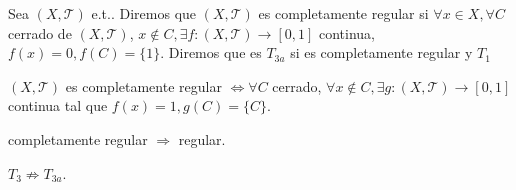  \begin{defn}
   Sea $( X, \mathcal{T} )$ e.t.. Diremos que $( X, \mathcal{T} )$ es completamente regular si $\forall x \in X, \forall C$ cerrado de $( X, \mathcal{T} )$, $x \not \in C, \exists f: ( X, \mathcal{T} ) \to [0,1]$ continua, $f(x) = 0, f(C) = \{ 1 \}$. Diremos que es $T_{3a}$ si es completamente regular y $T_{1}$
 \end{defn}

  \begin{obs}
    $( X, \mathcal{T} )$ es completamente regular $\Leftrightarrow \forall C$ cerrado, $\forall x \not \in C, \exists g: ( X, \mathcal{T} ) \to [0,1]$ continua tal que $ f(x) = 1, g(C) = \{  C \}$.
  \end{obs}

  \begin{obs}
    completamente regular $\Rightarrow$ regular.
  \end{obs}

  \begin{obs}
    $T_{3} \not \Rightarrow T_{3a}$.
  \end{obs}
